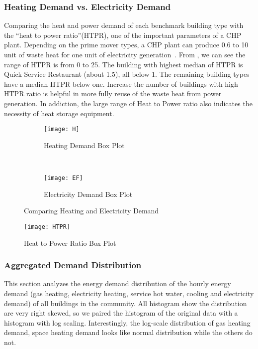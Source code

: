 \subsubsection{Heating Demand vs. Electricity Demand}
Comparing the heat and power demand of each benchmark building type
with the ``heat to power ratio''(HTPR), one of the important
parameters of a CHP plant. Depending on the prime mover types, a CHP
plant can produce 0.6 to 10 unit of waste heat for one unit of
electricity generation~\cite{introCHP2010}. From , we
can see the range of HTPR is from 0 to 25. The building with highest
median of HTPR is Quick Service Restaurant (about 1.5), all below
1. The remaining building types have a median HTPR below one. Increase
the number of buildings with high HTPR ratio is helpful in more fully
reuse of the waste heat from power generation. In addiction, the large
range of Heat to Power ratio also indicates the necessity of heat
storage equipment.
\begin{figure}[h!]
  \centering
  \begin{subfigure}{0.4\textwidth}
  \centering
  \texttt{[image: H]}
  \caption[Heating Demand Box Plot]{Heating Demand Box
    Plot}
  \label{fig:H}
\end{subfigure}
~
\begin{subfigure}{0.4\textwidth}
  \centering
  \texttt{[image: EF]}
  \caption[Electricity Demand Box Plot]{Electricity Demand Box Plot}
  \label{fig:EF2}
\end{subfigure}
\caption[Comparing Heating and Electricity Demand]{Comparing Heating
  and Electricity Demand}
\end{figure}

\begin{figure}[h!]
  \centering
  \texttt{[image: HTPR]}
  \caption[Heat to Power Ratio Box Plot]{Heat to Power Ratio Box Plot}
  \label{fig:HTPR}
\end{figure}%

\subsubsection{Aggregated Demand Distribution}
This section analyzes the energy demand distribution of the hourly
energy demand (gas heating, electricity heating, service hot water,
cooling and electricity demand) of all buildings in the community. All
histogram show the distribution are very right skewed, so we paired
the histogram of the original data with a histogram with log
scaling. Interestingly, the log-scale distribution of gas heating
demand, space heating demand looks like normal distribution while the
others do not.

